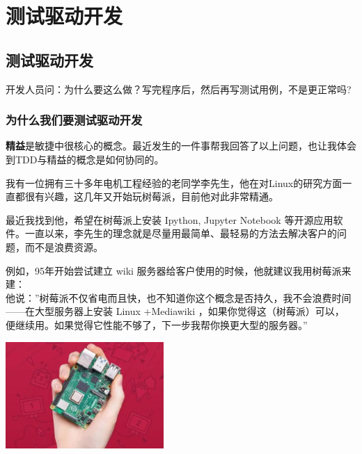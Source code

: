 \chapter{测试驱动开发} %

\hypertarget{ux6d4bux8bd5ux9a71ux52a8ux5f00ux53d1}{%
\section{测试驱动开发}\label{ux6d4bux8bd5ux9a71ux52a8ux5f00ux53d1}}

开发人员问：为什么要这么做？写完程序后，然后再写测试用例，不是更正常吗?

\hypertarget{ux4e3aux4ec0ux4e48ux6211ux4eecux8981ux6d4bux8bd5ux9a71ux52a8ux5f00ux53d1}{%
\subsection{为什么我们要测试驱动开发}\label{ux4e3aux4ec0ux4e48ux6211ux4eecux8981ux6d4bux8bd5ux9a71ux52a8ux5f00ux53d1}}

\textbf{精益}是敏捷中很核心的概念。最近发生的一件事帮我回答了以上问题，也让我体会到TDD与精益的概念是如何协同的。

我有一位拥有三十多年电机工程经验的老同学李先生，他在对Linux的研究方面一直都很有兴趣，这几年又开始玩树莓派，目前他对此非常精通。

最近我找到他，希望在树莓派上安装 Ipython, Jupyter Notebook
等开源应用软件。一直以来，李先生的理念就是尽量用最简单、最轻易的方法去解决客户的问题，而不是浪费资源。

例如，95年开始尝试建立 wiki
服务器给客户使用的时候，他就建议我用树莓派来建：\\
他说：''树莓派不仅省电而且快，也不知道你这个概念是否持久，我不会浪费时间------在大型服务器上安装
Linux +Mediawiki ，如果你觉得这（树莓派）可以，
便继续用。如果觉得它性能不够了，下一步我帮你换更大型的服务器。''


\includegraphics[width=6cm]{树莓派2.jpg}

